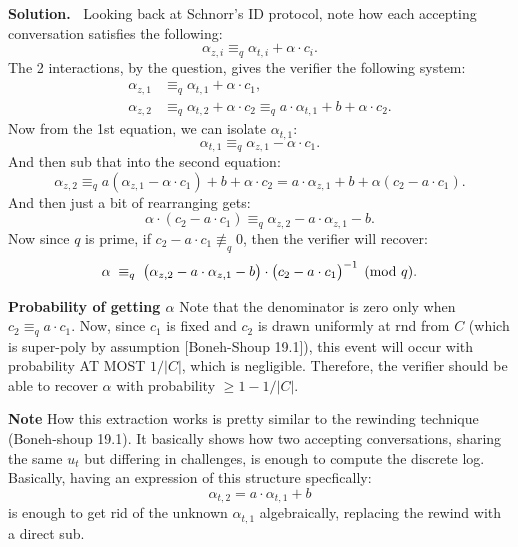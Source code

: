 \documentclass[12pt]{article}
\theoremstyle{definition}
\newcommand{\addbigskip}{\addvspace{\bigskipamount}}
\newenvironment{solution}
     {\addbigskip
      \noindent\color{blue}\textbf{Solution.\ }}
     {\par\addbigskip}
\newenvironment{solution}
     {\comment}
     {\endcomment}
\begin{document}
\begin{solution}
Looking back at Schnorr's ID protocol, note how each accepting conversation satisfies the following:
\[
\alpha_{z,i} \equiv_q \alpha_{t,i} + \alpha \cdot c_i.
\]
The 2 interactions, by the question, gives the verifier the following system:
\begin{align}
\alpha_{z,1} &\equiv_q \alpha_{t,1} + \alpha \cdot c_1, \tag{1}\\
\alpha_{z,2} &\equiv_q \alpha_{t,2} + \alpha \cdot c_2
             \equiv_q a\cdot\alpha_{t,1} + b + \alpha \cdot c_2. \tag{2}
\end{align}
Now from the 1st equation, we can isolate $\alpha_{t,1}$:
\[
\alpha_{t,1} \equiv_q \alpha_{z,1} - \alpha \cdot c_1.
\]
And then sub that into the second equation:
\[
\alpha_{z,2} \equiv_q a(\alpha_{z,1} - \alpha \cdot c_1) + b + \alpha \cdot c_2
= a \cdot \alpha_{z,1} + b + \alpha(c_2 - a \cdot c_1).
\]
And then just a bit of rearranging gets:
\[
\alpha \cdot (c_2 - a \cdot c_1) \equiv_q \alpha_{z,2} - a \cdot \alpha_{z,1} - b.
\]
Now since $q$ is prime, if $c_2 - a\cdot c_1 \not\equiv_q 0$, then the verifier will recover:
\[
\alpha \;\equiv_q\; \bigl(\alpha_{z,2} - a\cdot\alpha_{z,1} - b\bigr)
               \cdot \bigl(c_2 - a\cdot c_1\bigr)^{-1} \pmod{q}.\\
\]

\noindent\textbf{Probability of getting $\alpha$}
Note that the denominator is zero only when $c_2 \equiv_q a \cdot c_1$.
Now, since $c_1$ is fixed and $c_2$ is drawn uniformly at rnd from $C$ (which is super-poly by assumption [Boneh-Shoup 19.1]), this event will occur with probability AT MOST $1/|C|$, which is negligible.
Therefore, the verifier should be able to recover $\alpha$ with probability $\geq 1 - 1/|C|$.\\

\newpage

\noindent\textbf{Note}
How this extraction works is pretty similar to the rewinding technique (Boneh-shoup 19.1).
It basically shows how two accepting conversations, sharing the same $u_t$ but differing in challenges, is enough to compute the discrete log.\\

\noindent
Basically, having an expression of this structure specfically:\\
\begin{equation*}
     \alpha_{t,2} = a\cdot\alpha_{t,1}+b
\end{equation*}
is enough to get rid of the unknown $\alpha_{t,1}$ algebraically, replacing the rewind with a direct sub.
\end{solution}
\end{document}
